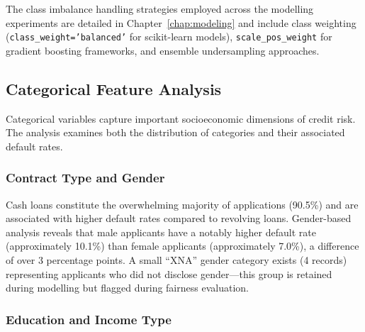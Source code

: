The class imbalance handling strategies employed across the modelling experiments are detailed in Chapter~\ref{chap:modeling} and include class weighting (\texttt{class\_weight='balanced'} for scikit-learn models), \texttt{scale\_pos\_weight} for gradient boosting frameworks, and ensemble undersampling approaches.

\subsection{Categorical Feature Analysis}
\label{subsec:categorical_eda}

Categorical variables capture important socioeconomic dimensions of credit risk. The analysis examines both the distribution of categories and their associated default rates.

\subsubsection{Contract Type and Gender}





Cash loans constitute the overwhelming majority of applications (90.5\%) and are associated with higher default rates compared to revolving loans. Gender-based analysis reveals that male applicants have a notably higher default rate (approximately 10.1\%) than female applicants (approximately 7.0\%), a difference of over 3 percentage points. A small ``XNA'' gender category exists (4 records) representing applicants who did not disclose gender---this group is retained during modelling but flagged during fairness evaluation.

\subsubsection{Education and Income Type}



